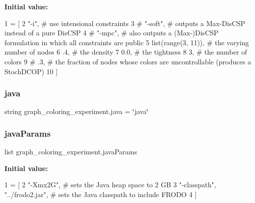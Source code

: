 {\bfseries Initial value\+:}
\begin{DoxyCode}
1 =  [
2             \textcolor{stringliteral}{"-i"},               \textcolor{comment}{# use intensional constraints}
3 \textcolor{comment}{#           "-soft",            # outputs a Max-DisCSP instead of a pure DisCSP}
4 \textcolor{comment}{#           "-mpc",             # also outputs a (Max-)DisCSP formulation in which all constraints are
       public}
5             list(range(3, 11)), \textcolor{comment}{# the varying number of nodes}
6             .4,                 \textcolor{comment}{# the density }
7             0.0,                \textcolor{comment}{# the tightness}
8             3,                  \textcolor{comment}{# the number of colors}
9 \textcolor{comment}{#           .3,                 # the fraction of nodes whose colors are uncontrollable (produces a
       StochDCOP)}
10             ]
\end{DoxyCode}
\mbox{\label{namespacegraph__coloring__experiment_a7feb979c3a7d45682ec6a409932ff98c}} 
\subsubsection{\texorpdfstring{java}{java}}
{\footnotesize\ttfamily string graph\+\_\+coloring\+\_\+experiment.\+java = \char`\"{}java\char`\"{}}

\mbox{\label{namespacegraph__coloring__experiment_a233413ce8a774f77dfc77347c2a22422}} 
\subsubsection{\texorpdfstring{java\+Params}{javaParams}}
{\footnotesize\ttfamily list graph\+\_\+coloring\+\_\+experiment.\+java\+Params}

{\bfseries Initial value\+:}
\begin{DoxyCode}
1 =  [
2             \textcolor{stringliteral}{"-Xmx2G"}, \textcolor{comment}{# sets the Java heap space to 2 GB}
3             \textcolor{stringliteral}{"-classpath"}, \textcolor{stringliteral}{"../frodo2.jar"}, \textcolor{comment}{# sets the Java classpath to include FRODO}
4             ]
\end{DoxyCode}
\mbox{\label{namespacegraph__coloring__experiment_a9860a2d0dc6e3b34b1b1fea39c27c6b4}} 
